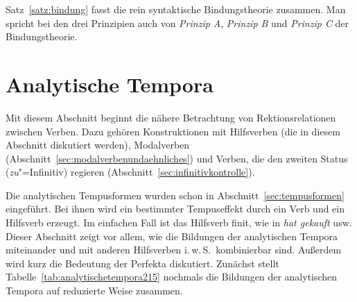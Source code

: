 \begin{exe}
  \ex\label{ex:bindung211}
  \begin{xlist}
  \end{xlist}
\end{exe}

Satz~\ref{satz:bindung} fasst die rein syntaktische Bindungstheorie zusammen.
Man spricht bei den drei Prinzipien auch von \textit{Prinzip A}, \textit{Prinzip B} und \textit{Prinzip C} der Bindungstheorie.



\section{Analytische Tempora}
\label{sec:analytischetempora}

Mit diesem Abschnitt beginnt die nähere Betrachtung von Rektionsrelationen zwischen Verben.
Dazu gehören Konstruktionen mit Hilfsverben (die in diesem Abschnitt diskutiert werden), Modalverben (Abschnitt~\ref{sec:modalverbenundaehnliches}) und Verben, die den zweiten Status (\textit{zu}"=Infinitiv) regieren (Abschnitt~\ref{sec:infinitivkontrolle}).

Die analytischen Tempusformen wurden schon in Abschnitt~\ref{sec:tempusformen} eingeführt.
Bei ihnen wird ein bestimmter Tempuseffekt durch ein Verb und ein Hilfsverb erzeugt.
Im einfachen Fall ist das Hilfsverb finit, wie in \textit{hat gekauft} usw.
Dieser Abschnitt zeigt vor allem, wie die Bildungen der analytischen Tempora miteinander und mit anderen Hilfsverben i.\,w.\,S.\ kombinierbar sind.
Außerdem wird kurz die Bedeutung der Perfekta diskutiert.
Zunächst stellt Tabelle~\ref{tab:analytischetempora215} nochmals die Bildungen der analytischen Tempora auf reduzierte Weise zusammen.

